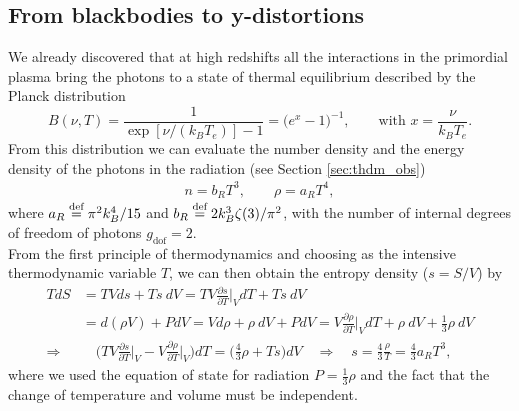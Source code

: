 \subsection{From blackbodies to y-distortions}
We already discovered that at high redshifts all the interactions in the primordial plasma bring the photons to a state of thermal equilibrium described by the Planck distribution
$$B(\nu,T)=\frac{1}{\exp[\nu/(k_BT_e)]-1}=\big(e^x-1\big)^{-1},\qquad \text{with }x=\frac{\nu}{k_BT_e}.$$
From this distribution we can evaluate the number density and the energy density of the photons in the radiation (see Section \ref{sec:thdm_obs})
\begin{align*}
    n=b_RT^3,\qquad \rho=a_RT^4,
\end{align*}
where $a_R\stackrel{\text{def}}{=}\pi^2k_B^4/15$ and $b_R\stackrel{\text{def}}{=} 2k_B^3\zeta(3)/\pi^2$, with the number of internal degrees of freedom of photons $g_\text{dof}=2$.\\From the first principle of thermodynamics and choosing as the intensive thermodynamic variable $T$, we can then obtain the entropy density ($s=S/V$) by
\begin{align*}
    TdS&=TVds+Ts\ dV=TV\frac{\partial s}{\partial T}\bigg|_V dT+Ts\ dV\\&=d(\rho V)+PdV=Vd\rho+\rho\ dV+PdV=V\frac{\partial \rho}{\partial T}\bigg|_V dT+\rho\ dV+\frac{1}{3}\rho\ dV\\\Rightarrow& \quad \bigg(TV\frac{\partial s}{\partial T}\bigg|_V-V\frac{\partial \rho}{\partial T}\bigg|_V\bigg)dT=\bigg(\frac{4}{3}\rho+Ts\bigg)dV\quad\Rightarrow\quad \boxed{s=\frac{4}{3}\frac{\rho}{T}=\frac{4}{3}a_RT^3},
\end{align*}
where we used the equation of state for radiation $P=\frac{1}{3}\rho$ and the fact that the change of temperature and volume must be independent.

